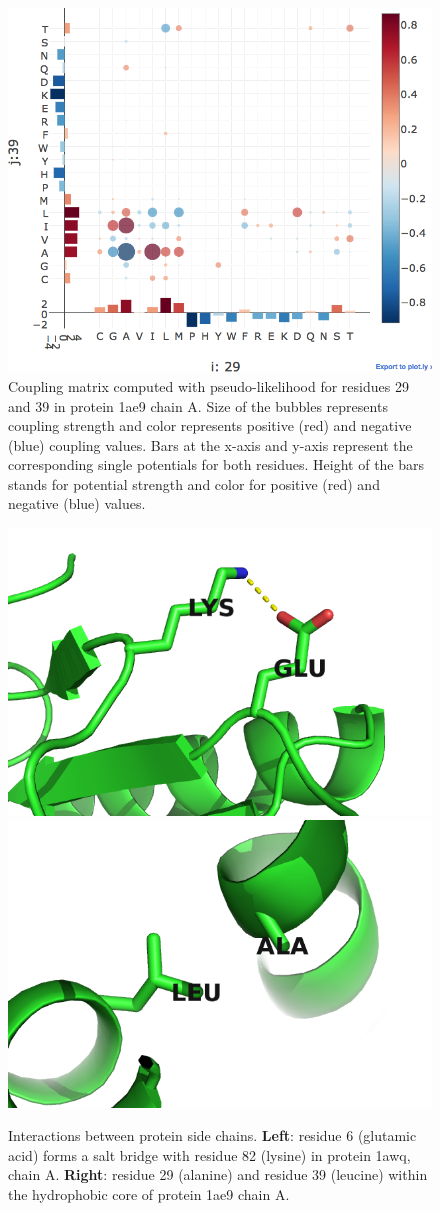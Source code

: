 \documentclass[12pt,a4paper,twoside]{book}
\theoremstyle{definition}
\theoremstyle{definition}
\theoremstyle{remark}
\begin{document}
\begin{figure}
\includegraphics[width=0.9\linewidth]{img/coupling_matrix_analysis/coupling_matrix_1ae9A00_29_39_notitle} \caption{Coupling matrix
computed with pseudo-likelihood for residues 29 and 39 in protein 1ae9
chain A. Size of the bubbles represents coupling strength and color
represents positive (red) and negative (blue) coupling values. Bars at
the x-axis and y-axis represent the corresponding single potentials for
both residues. Height of the bars stands for potential strength and
color for positive (red) and negative (blue) values.}\label{fig:coupling-matrix-hydrophobic-interaction}
\end{figure}







\begin{figure}
\includegraphics[width=0.5\linewidth]{img/coupling_matrix_analysis/1a9xA05_6_82} \includegraphics[width=0.5\linewidth]{img/coupling_matrix_analysis/1ae9A00_29_39} \caption{Interactions between protein side
chains. \textbf{Left}: residue 6 (glutamic acid) forms a salt bridge
with residue 82 (lysine) in protein 1awq, chain A. \textbf{Right}:
residue 29 (alanine) and residue 39 (leucine) within the hydrophobic
core of protein 1ae9 chain A.}\label{fig:coupling-matrix-pymol}
\end{figure}
\end{document}
